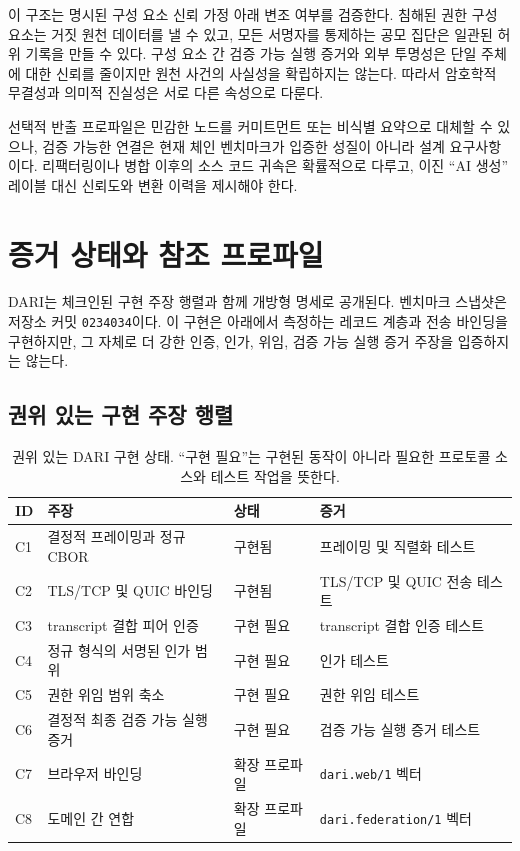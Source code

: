 \documentclass[10pt]{article}
\begin{document}
이 구조는 명시된 구성 요소 신뢰 가정 아래 변조 여부를 검증한다. 침해된 권한 구성 요소는 거짓 원천 데이터를 낼 수 있고, 모든 서명자를 통제하는 공모 집단은 일관된 허위 기록을 만들 수 있다. 구성 요소 간 검증 가능 실행 증거와 외부 투명성은 단일 주체에 대한 신뢰를 줄이지만 원천 사건의 사실성을 확립하지는 않는다. 따라서 암호학적 무결성과 의미적 진실성은 서로 다른 속성으로 다룬다.

선택적 반출 프로파일은 민감한 노드를 커미트먼트 또는 비식별 요약으로 대체할 수 있으나, 검증 가능한 연결은 현재 체인 벤치마크가 입증한 성질이 아니라 설계 요구사항이다. 리팩터링이나 병합 이후의 소스 코드 귀속은 확률적으로 다루고, 이진 ``AI 생성'' 레이블 대신 신뢰도와 변환 이력을 제시해야 한다.

\section{증거 상태와 참조 프로파일}
\label{sec:implementation}

DARI는 체크인된 구현 주장 행렬과 함께 개방형 명세로 공개된다. 벤치마크 스냅샷은 저장소 커밋 \texttt{0234034}이다. 이 구현은 아래에서 측정하는 레코드 계층과 전송 바인딩을 구현하지만, 그 자체로 더 강한 인증, 인가, 위임, 검증 가능 실행 증거 주장을 입증하지는 않는다.

\subsection{권위 있는 구현 주장 행렬}

\begin{table}[t]
\centering
\caption{권위 있는 DARI 구현 상태. ``구현 필요''는 구현된 동작이 아니라 필요한 프로토콜 소스와 테스트 작업을 뜻한다.}
\label{tab:claims}
\scriptsize
\begin{tabularx}{\textwidth}{@{}l Y l Y@{}}
\toprule
ID & 주장 & 상태 & 증거 \\
\midrule
C1 & 결정적 프레이밍과 정규 CBOR & 구현됨 & 프레이밍 및 직렬화 테스트 \\
C2 & TLS/TCP 및 QUIC 바인딩 & 구현됨 & TLS/TCP 및 QUIC 전송 테스트 \\
C3 & transcript 결합 피어 인증 & 구현 필요 & transcript 결합 인증 테스트 \\
C4 & 정규 형식의 서명된 인가 범위 & 구현 필요 & 인가 테스트 \\
C5 & 권한 위임 범위 축소 & 구현 필요 & 권한 위임 테스트 \\
C6 & 결정적 최종 검증 가능 실행 증거 & 구현 필요 & 검증 가능 실행 증거 테스트 \\
C7 & 브라우저 바인딩 & 확장 프로파일 & \texttt{dari.web/1} 벡터 \\
C8 & 도메인 간 연합 & 확장 프로파일 & \texttt{dari.federation/1} 벡터 \\
\bottomrule
\end{tabularx}
\end{table}
\end{document}
